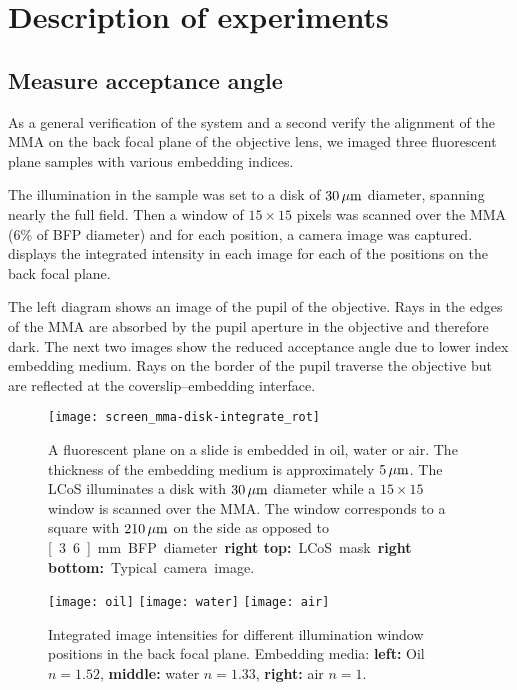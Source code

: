 \chapter{Description of experiments}
\label{sec:experiments}
\section{Measure acceptance angle}
As a general verification of the system and a second verify the
alignment of the MMA on the back focal plane of the objective lens, we
imaged three fluorescent plane samples with various embedding indices.

The illumination in the sample was set to a disk of $\unit[30]{\mu m}$
diameter, spanning nearly the full field. Then a window of
$15\times15$ pixels was scanned over the MMA (6\% of BFP diameter) and
for each position, a camera image was
captured.  displays the integrated
intensity in each image for each of the positions on the back focal
plane.

The left diagram shows an image of the pupil of the objective. Rays in
the edges of the MMA are absorbed by the pupil aperture in the
objective and therefore dark. The next two images show the reduced
acceptance angle due to lower index embedding medium. Rays on the
border of the pupil traverse the objective but are reflected at the
coverslip--embedding interface.

\begin{figure}[H]
  \centering
   
  \texttt{[image: screen\_mma-disk-integrate\_rot]}
  \caption{A fluorescent plane on a slide is embedded in oil, water or
    air. The thickness of the embedding medium is approximately
    $\unit[5]{\mu m}$. The LCoS illuminates a disk with $\unit[30]{\mu
      m}$ diameter while a $15\times 15$ window is scanned over the
    MMA. The window corresponds to a square with $\unit[210]{\mu m}$
    on the side as opposed to \unit[3.6]{mm} BFP diameter {\bf right top:} 
    LCoS mask. {\bf right bottom:} Typical
    camera image.}
  \label{fig:tirf-exp}
\end{figure}


\begin{figure}[H]
  \centering
  \texttt{[image: oil]}
  \texttt{[image: water]}
  \texttt{[image: air]}
  \caption{Integrated image intensities for different illumination
    window positions in the back focal plane. Embedding media: {\bf
      left:} Oil $n=1.52$, {\bf middle:} water $n=1.33$, {\bf right:}
    air $n=1$.  }
  \label{fig:immersion-bfp-scan}
\end{figure}

